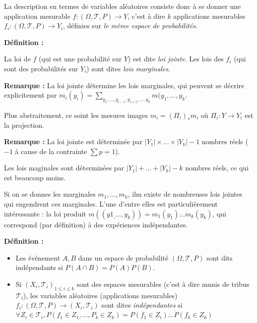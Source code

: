 \documentclass[10pt,a4paper,notitlepage ]{article}
\newenvironment{definition}{
	
	\textbf{Définition : }
}
{}
\newenvironment{rem}{
	
	\textbf{Remarque :}}{}
\begin{document}
La description en termes de variables aléatoires consiste donc à se donner une application mesurable $f : (\Omega, \mathcal T, P) \rightarrow Y$, c'est à dire $k$ applications mesurables $f_i : (\Omega, \mathcal T, P) \rightarrow Y_i$, définies sur \emph{le même espace de probabilités}.

\begin{definition}
	La loi de $f$ (qui est une probabilité sur $Y$) est dite \emph{loi jointe}. Les lois des $f_i$ (qui sont des probabilités sur $Y_i$) sont dites \emph{lois marginales}.
\end{definition}

\begin{rem}
	La loi jointe détermine les lois marginales, qui peuvent se décrire explicitement par $m_i(y_i)=\underset{y_1,\dots,y_{i-1},y_{i+1},\dots,y_k}{\sum} m(y_1,\dots,y_k$.
	
	Plus abstraitement, ce soint les mesures images $m_i=(\Pi_i)_*m_i$ où $\Pi_i : Y \rightarrow Y_i$ est la projection.
\end{rem}

\begin{rem}
	La loi jointe est déterminée par $|Y_1|\times\dots\times |Y_k| - 1$ nombres réels ($-1$ à cause de la contrainte $\sum p = 1$).
	
	Les lois maginales sont déterminées par $|Y_1| + \dots + |Y_k| - k$ nombres réels, ce qui est beaucoup moins.
\end{rem}

Si on se donnes les marginales $m_1, \dots, m_k$, ilm existe de nombreuses lois jointes qui engendrent ces marginales. L'une d'entre elles est particulièrement intéressante : la loi produit $m((y1_,\dots,y_k))=m_1(y_1) \dot \dots \dot m_k(y_k)$, qui correspond (par définition) à des expériences indépendantes.

\begin{definition}
	\begin{itemize}
		\item Les événement $A,B$ dans un espace de probabilité $(\Omega,\mathcal T, P)$ sont dits indépendants si $P(A\cap B) = P(A)P(B)$.
		\item Si $(X_i, \mathcal T_i)_{1\le i\le k}$ sont des espaces mesurables (c'est à dire munis de tribus $\mathcal T_i$), les variables aléatoires (applications mesurables) $f_i : (\Omega,\mathcal T, P) \rightarrow (X_i,\mathcal T_i)$ sont dites \emph{indépendantes} si $\forall Z_i \in \mathcal T_i, P(f_1\in Z_1, \dots, P_k \in Z_k) = P(f_1 \in Z_i) \dot \dots \dot P(f_k \in Z_k)$
	\end{itemize}
\end{definition}
\end{document}
